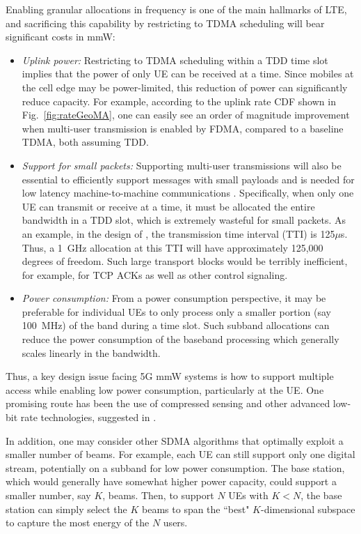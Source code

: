 \documentclass[journal]{IEEEtran}
\begin{document}
Enabling granular allocations in frequency is one of the main
hallmarks of LTE, and sacrificing this capability by restricting to TDMA scheduling
will bear significant costs in mmW:
\begin{itemize}
\item \emph{Uplink power:}
Restricting to TDMA scheduling within a TDD time slot implies that
the power of only UE can be received at a time.
Since mobiles at the cell edge may be power-limited,
this reduction of power can significantly reduce capacity.
For example,
according to the uplink rate CDF shown in Fig.~\ref{fig:rateGeoMA}, one can easily see an order of magnitude improvement when multi-user transmission is enabled by FDMA, compared to a baseline TDMA,
both assuming TDD.

\item \emph{Support for small packets:}
Supporting multi-user transmissions will also be essential
to efficiently support messages with small payloads
and is needed for low latency machine-to-machine communications \cite{fettweis2011entering}.
Specifically, when only one UE can transmit
or receive at a time, it must be allocated the entire bandwidth
in a TDD slot, which is extremely
wasteful for small packets.  As an example, in the design of \cite{KhanPi:11-CommMag},
the transmission time interval (TTI) is 125$\mu$s.  Thus, a 1~GHz allocation at this TTI
will have approximately 125,000 degrees of freedom.  Such large transport blocks
would be terribly inefficient, for example, for TCP ACKs as well as other control signaling.

\item \emph{Power consumption:}
From a power consumption perspective, it may be preferable for individual UEs
to only process only a smaller portion (say 100~MHz) of the band
during a time slot.  Such subband allocations
can reduce the power consumption of the baseband processing
which generally scales linearly
in the bandwidth.
\end{itemize}

Thus, a key design issue facing 5G mmW systems is how to support multiple access while
enabling low power consumption, particularly at the UE.
One promising route has been the use of compressed sensing and other
advanced low-bit rate technologies, suggested in \cite{Madhow:ADC}.

In addition, one may consider other SDMA algorithms that optimally exploit
a smaller number of beams.  For example, each UE can still support only one digital stream,
potentially on a subband for low power consumption.  The base station, which
would generally have somewhat higher power capacity, could support a smaller
number, say $K$, beams.  Then, to support $N$ UEs with $K < N$, the base station
can simply select the $K$ beams to span the ``best" $K$-dimensional subspace
to capture the most energy of the $N$ users.
\end{document}
